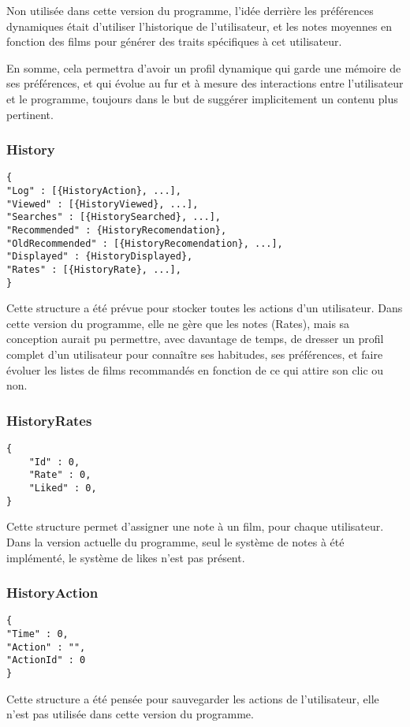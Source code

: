 Non utilisée dans cette version du programme, l'idée derrière les préférences dynamiques était d'utiliser l'historique de l'utilisateur, et les notes moyennes en fonction des films pour générer des \og traits \fg spécifiques à cet utilisateur.\par
En somme, cela permettra d'avoir un profil dynamique qui garde une mémoire de ses préférences, et qui évolue au fur et à mesure des interactions entre l'utilisateur et le programme, toujours dans le but de suggérer implicitement un contenu plus pertinent.

\subsubsection{History}

\begin{lstlisting}
{
"Log" : [{HistoryAction}, ...],
"Viewed" : [{HistoryViewed}, ...],
"Searches" : [{HistorySearched}, ...],
"Recommended" : {HistoryRecomendation},
"OldRecommended" : [{HistoryRecomendation}, ...],
"Displayed" : {HistoryDisplayed},
"Rates" : [{HistoryRate}, ...],
}
\end{lstlisting}
Cette structure a été prévue pour stocker toutes les actions d'un utilisateur. Dans cette version du programme, elle ne gère que les notes (Rates), mais sa conception aurait pu permettre, avec davantage de temps, de dresser un profil complet d'un utilisateur pour connaître ses habitudes, ses préférences, et faire évoluer les listes de films recommandés en fonction de ce qui attire son clic ou non.


\subsubsection{HistoryRates}

\begin{lstlisting}
{
	"Id" : 0,
	"Rate" : 0,
	"Liked" : 0,
}
\end{lstlisting}

Cette structure permet d'assigner une note à un film, pour chaque utilisateur.
Dans la version actuelle du programme, seul le système de notes à été implémenté, le système de likes n'est pas présent.

\subsubsection{HistoryAction}
\begin{lstlisting}
{
"Time" : 0,
"Action" : "",
"ActionId" : 0
}
\end{lstlisting}
Cette structure a été pensée pour sauvegarder les actions de l'utilisateur, elle n'est pas utilisée dans cette version du programme.

